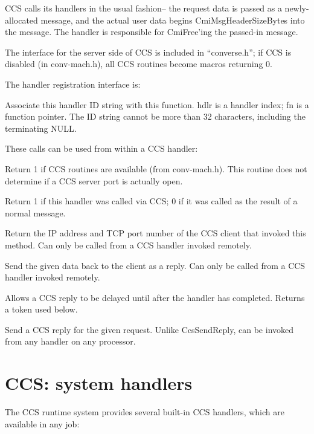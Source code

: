 CCS calls its handlers in the usual \converse{} fashion--
the request data is passed as a newly-allocated message,
and the actual user data begins CmiMsgHeaderSizeBytes
into the message.  The handler is responsible for CmiFree'ing
the passed-in message.

The interface for the server side of CCS is included in 
``converse.h''; if CCS is disabled (in conv-mach.h), all
CCS routines become macros returning 0.

The handler registration interface is:

Associate this handler ID string with this function.  
hdlr is a \converse{} handler index; fn is a function pointer.
The ID string cannot be more than 32 characters, including the
terminating NULL.



These calls can be used from within a CCS handler:

Return 1 if CCS routines are available (from conv-mach.h).
This routine does not determine if a CCS server port is 
actually open.

Return 1 if this handler was called via CCS; 0 if it was
called as the result of a normal \converse{} message.

Return the IP address and TCP port number
of the CCS client that invoked this method.
Can only be called from a CCS handler invoked remotely.

Send the given data back to the client as a reply.
Can only be called from a CCS handler invoked remotely.

Allows a CCS reply to be delayed until after the handler
has completed.  Returns a token used below.

Send a CCS reply for the given request.  Unlike
CcsSendReply, can be invoked from any handler on any processor.


\section{CCS: system handlers}
The CCS runtime system provides several built-in CCS handlers,
which are available in any \converse{} job:

